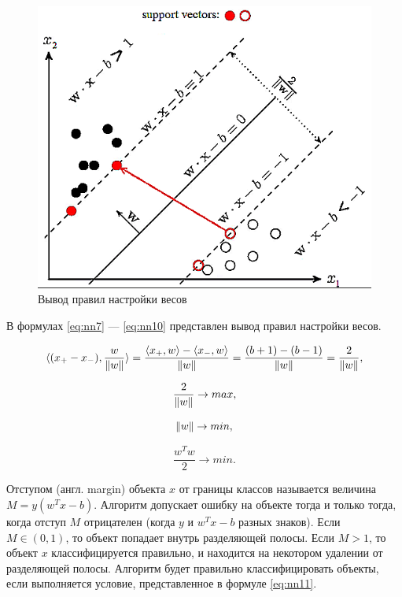\begin{figure}[H]
	\centering
	\includegraphics[width=\textwidth]{img/svm2.png}
	\caption{Вывод правил настройки весов}
	\label{fig:svm2}
\end{figure}

В формулах \ref{eq:nn7} --- \ref{eq:nn10} представлен вывод правил настройки весов.

\begin{equation}
	\label{eq:nn7}
	\langle(x_+-x_-),\frac{w}{\Arrowvert w\Arrowvert}\rangle = \frac{\langle x_+,w\rangle - \langle x_-,w\rangle}{\Arrowvert w\Arrowvert} = \frac{(b+1)-(b-1)}{\Arrowvert w\Arrowvert} = \frac{2}{\Arrowvert w\Arrowvert},
\end{equation}

\begin{equation}
	\label{eq:nn8}
	\frac{2}{\Arrowvert w\Arrowvert} \rightarrow max,
\end{equation}

\begin{equation}
	\label{eq:nn9}
	\Arrowvert w\Arrowvert \rightarrow min,
\end{equation}

\begin{equation}
	\label{eq:nn10}
	\frac{w^Tw}{2} \rightarrow min.
\end{equation}

Отступом (англ. margin) объекта $x$ от границы классов называется величина $M=y(w^Tx-b)$. Алгоритм допускает ошибку на объекте тогда и только тогда, когда отступ $M$ отрицателен (когда $y$ и $w^Tx-b$ разных знаков). Если $M ∈ (0, 1)$, то объект попадает внутрь разделяющей полосы. Если $M > 1$, то объект $x$ классифицируется правильно, и находится на некотором удалении от разделяющей полосы. Алгоритм будет правильно классифицировать объекты, если выполняется условие, представленное в формуле \ref{eq:nn11}.

